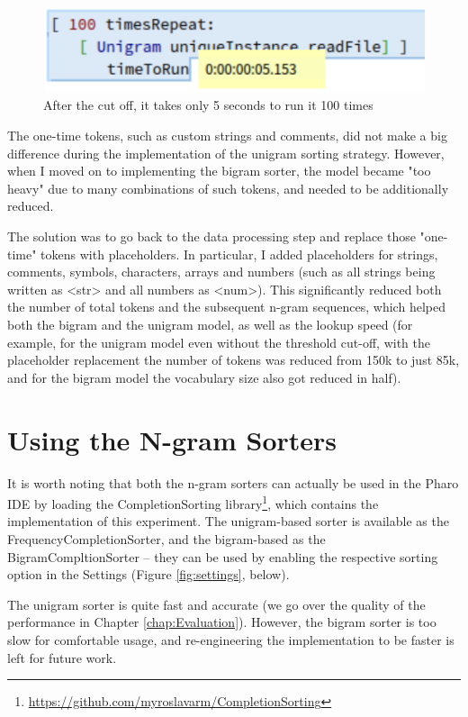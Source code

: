\begin{figure}[H]
    \centering
    \includegraphics[width=0.7\linewidth]{images/unigramTimeToRunFast.png}
    \caption{After the cut off, it takes only 5 seconds to run it 100 times}
    \label{fig:sorterFast}
\end{figure}

The one-time tokens, such as custom strings and comments, did not make a big difference during the implementation of the unigram sorting strategy. However, when I moved on to implementing the bigram sorter, the model became "too heavy" due to many combinations of such tokens, and needed to be additionally reduced.

The solution was to go back to the data processing step and replace those "one-time" tokens with placeholders. In particular, I added placeholders for strings, comments, symbols, characters, arrays and numbers (such as all strings being written as <str> and all numbers as <num>). This significantly reduced both the number of total tokens and the subsequent n-gram sequences, which helped both the bigram and the unigram model, as well as the lookup speed (for example, for the unigram model even without the threshold cut-off, with the placeholder replacement the number of tokens was reduced from 150k to just 85k, and for the bigram model the vocabulary size also got reduced in half).

\section{Using the N-gram Sorters}
\label{sec:ProposedSolution-Usage}
It is worth noting that both the n-gram sorters can actually be used in the Pharo IDE by loading the CompletionSorting library\footnote{\url{https://github.com/myroslavarm/CompletionSorting}}, which contains the implementation of this experiment. The unigram-based sorter is available as the FrequencyCompletionSorter, and the bigram-based as the BigramCompltionSorter -- they can be used by enabling the respective sorting option in the Settings (Figure \ref{fig:settings}, below).

The unigram sorter is quite fast and accurate (we go over the quality of the performance in Chapter \ref{chap:Evaluation}). However, the bigram sorter is too slow for comfortable usage, and re-engineering the implementation to be faster is left for future work.

